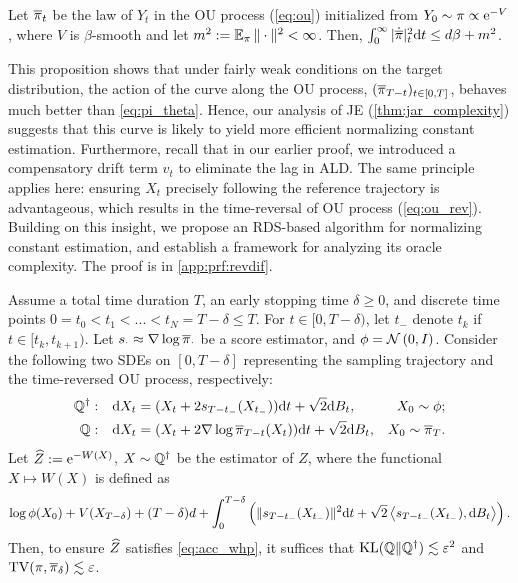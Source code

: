 \begin{proposition}
    Let $\overline{\pi}_t$ be the law of $Y_t$ in the OU process (\cref{eq:ou}) initialized from $Y_0\sim\pi\propto\mathrm{e}^{-V}$, where $V$ is $\beta$-smooth and let $m^2:=\operatorname{\mathbb{E}}_\pi\|\cdot\|^2<\infty$. Then, $\int_0^\infty|\dot{\overline{\pi}}|^2_t\mathrm{d} t\le d\beta+m^2$.
    \label{thm:action_ou}
\end{proposition}

This proposition shows that under fairly weak conditions on the target distribution, the action of the curve along the OU process, $(\overline{\pi}_{T-t})_{t\in[0,T]}$, behaves much better than \cref{eq:pi_theta}. Hence, our analysis of JE (\cref{thm:jar_complexity}) suggests that this curve is likely to yield more efficient normalizing constant estimation. Furthermore, recall that in our earlier proof, we introduced a compensatory drift term $v_t$ to eliminate the lag in ALD. The same principle applies here: ensuring $X_t$ precisely following the reference trajectory is advantageous, which results in the time-reversal of OU process (\cref{eq:ou_rev}). Building on this insight, we propose an RDS-based algorithm for normalizing constant estimation, and establish a framework for analyzing its oracle complexity. The proof is in \cref{app:prf:revdif}.

\begin{theorem}
    Assume a total time duration $T$, an early stopping time $\delta\ge0$, and discrete time points $0=t_0<t_1<...<t_N=T-\delta\le T$. For $t\in[0,T-\delta)$, let $t_-$ denote $t_k$ if $t\in[t_k,t_{k+1})$. Let $s_\cdot\approx\nabla\log\overline{\pi}_\cdot$ be a score estimator, and $\phi=\operatorname{\mathcal{N}}\left(0,I\right)$. Consider the following two SDEs on $[0,T-\delta]$ representing the sampling trajectory and the time-reversed OU process, respectively:
    \begin{align}
        \mathbb{Q}^\dagger:\quad&\mathrm{d} X_t=(X_t+2s_{T-t_-}(X_{t_-}))\mathrm{d} t+\sqrt{2}\mathrm{d} B_t,&X_0\sim\phi;\label{eq:ou_rev_score}\\
        \mathbb{Q}:\quad&\mathrm{d} X_t=(X_t+2\nabla\log\overline{\pi}_{T-t}(X_t))\mathrm{d} t+\sqrt{2}\mathrm{d} B_t,&X_0\sim\overline{\pi}_T.\nonumber
    \end{align}
    Let $\widehat{Z}:=\mathrm{e}^{-W(X)}$, $X\sim\mathbb{Q}^\dagger$ be the estimator of $Z$, where the functional $X\mapsto W(X)$ is defined as
    \begin{align*}
        \log\phi(X_0)+V(X_{T-\delta})+(T-\delta)d+\int_0^{T-\delta}\left(\|s_{T-t_-}(X_{t_-})\|^2\mathrm{d} t+\sqrt{2}\left\langle s_{T-t_-}(X_{t_-}),\mathrm{d} B_t\right\rangle\right).
    \end{align*}
    Then, to ensure $\widehat{Z}$ satisfies \cref{eq:acc_whp}, it suffices that $\operatorname{KL}(\mathbb{Q}\|\mathbb{Q}^\dagger)\lesssim\varepsilon^2$ and $\operatorname{TV}(\pi,\overline{\pi}_\delta)\lesssim\varepsilon$.
    \label{thm:revdif}
\end{theorem}


